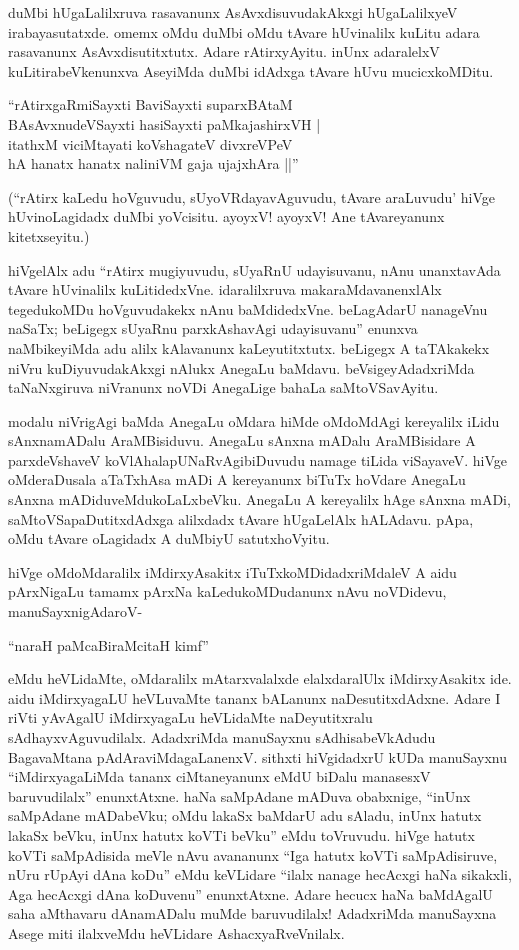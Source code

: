 duMbi hUgaLalilxruva rasavanunx AsAvxdisuvudakAkxgi hUgaLalilxyeV irabayasutatxde. omemx oMdu duMbi oMdu tAvare hUvinalilx kuLitu adara rasavanunx AsAvxdisutitxtutx. Adare rAtirxyAyitu. inUnx adaralelxV kuLitirabeVkenunxva AseyiMda duMbi idAdxga tAvare hUvu mucicxkoMDitu.

\begin{shloka}
``rAtirxgaRmiSayxti BaviSayxti suparxBAtaM\\
BAsAvxnudeVSayxti hasiSayxti paMkajashirxVH |\\
itathxM viciMtayati koVshagateV divxreVPeV\\
hA hanatx hanatx naliniVM gaja ujajxhAra ||''
\end{shloka}

(``rAtirx kaLedu hoVguvudu, sUyoVRdayavAguvudu, tAvare araLuvudu' hiVge hUvinoLagidadx duMbi yoVcisitu. ayoyxV! ayoyxV! Ane tAvareyanunx kitetxseyitu.)

hiVgelAlx adu ``rAtirx mugiyuvudu, sUyaRnU udayisuvanu, nAnu unanxtavAda tAvare hUvinalilx kuLitidedxVne. idaralilxruva makaraMdavanenxlAlx tegedukoMDu hoVguvudakekx nAnu baMdidedxVne. beLagAdarU nanageVnu naSaTx; beLigegx sUyaRnu parxkAshavAgi udayisuvanu'' enunxva naMbikeyiMda adu alilx kAlavanunx kaLeyutitxtutx. beLigegx A taTAkakekx niVru kuDiyuvudakAkxgi nAlukx AnegaLu baMdavu. beVsigeyAdadxriMda taNaNxgiruva niVranunx noVDi AnegaLige bahaLa saMtoVSavAyitu.

modalu niVrigAgi baMda AnegaLu oMdara hiMde oMdoMdAgi kereyalilx iLidu sAnxnamADalu AraMBisiduvu. AnegaLu sAnxna mADalu AraMBisidare A parxdeVshaveV koVlAhalapUNaRvAgibiDuvudu namage tiLida viSayaveV. hiVge oMderaDusala aTaTxhAsa mADi A kereyanunx biTuTx hoVdare AnegaLu sAnxna mADiduveMdukoLaLxbeVku. AnegaLu A kereyalilx hAge sAnxna mADi, saMtoVSapaDutitxdAdxga alilxdadx tAvare hUgaLelAlx hALAdavu. pApa, oMdu tAvare oLagidadx A duMbiyU satutxhoVyitu.

hiVge oMdoMdaralilx iMdirxyAsakitx iTuTxkoMDidadxriMdaleV A aidu pArxNigaLu tamamx pArxNa kaLedukoMDudanunx nAvu noVDidevu, manuSayxnigAdaroV-

\begin{shloka}
``naraH paMcaBiraMcitaH kimf''
\end{shloka}

\noindent eMdu heVLidaMte, oMdaralilx mAtarxvalalxde elalxdaralUlx iMdirxyAsakitx ide. aidu iMdirxyagaLU heVLuvaMte tananx bALanunx naDesutitxdAdxne. Adare I riVti yAvAgalU iMdirxyagaLu heVLidaMte naDeyutitxralu sAdhayxvAguvudilalx. AdadxriMda manuSayxnu sAdhisabeVkAdudu BagavaMtana pAdAraviMdagaLanenxV. sithxti hiVgidadxrU kUDa manuSayxnu ``iMdirxyagaLiMda tananx ciMtaneyanunx eMdU biDalu manasesxV baruvudilalx'' enunxtAtxne. haNa saMpAdane mADuva obabxnige, ``inUnx saMpAdane mADabeVku; oMdu lakaSx baMdarU adu sAladu, inUnx hatutx lakaSx beVku, inUnx hatutx koVTi beVku'' eMdu toVruvudu. hiVge hatutx koVTi saMpAdisida meVle nAvu avananunx ``Iga hatutx koVTi saMpAdisiruve, nUru rUpAyi dAna koDu'' eMdu keVLidare ``ilalx nanage hecAcxgi haNa sikakxli, Aga hecAcxgi dAna koDuvenu'' enunxtAtxne. Adare hecucx haNa baMdAgalU saha aMthavaru dAnamADalu muMde baruvudilalx! AdadxriMda manuSayxna Asege miti ilalxveMdu heVLidare AshacxyaRveVnilalx.

